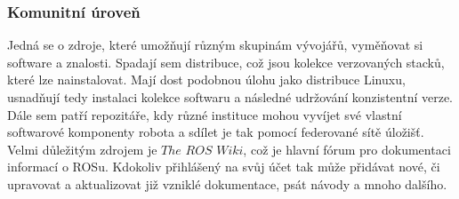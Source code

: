 \documentclass[12pt]{article}
\begin{document}
\subsubsection{Komunitní úroveň}
Jedná se o zdroje, které umožňují různým skupinám vývojářů, vyměňovat si software a znalosti. Spadají sem distribuce, což jsou kolekce verzovaných stacků, které lze nainstalovat. Mají dost podobnou úlohu jako distribuce Linuxu, usnadňují tedy instalaci kolekce softwaru a následné udržování konzistentní verze. Dále sem patří repozitáře, kdy různé instituce mohou vyvíjet své vlastní softwarové komponenty robota a sdílet je tak pomocí federované sítě úložišť. Velmi důležitým zdrojem je $The$ $ROS$ $Wiki$, což je hlavní fórum pro dokumentaci informací o ROSu. Kdokoliv přihlášený na svůj účet tak může přidávat nové, či upravovat a aktualizovat již vzniklé dokumentace, psát návody a mnoho dalšího.
\end{document}
